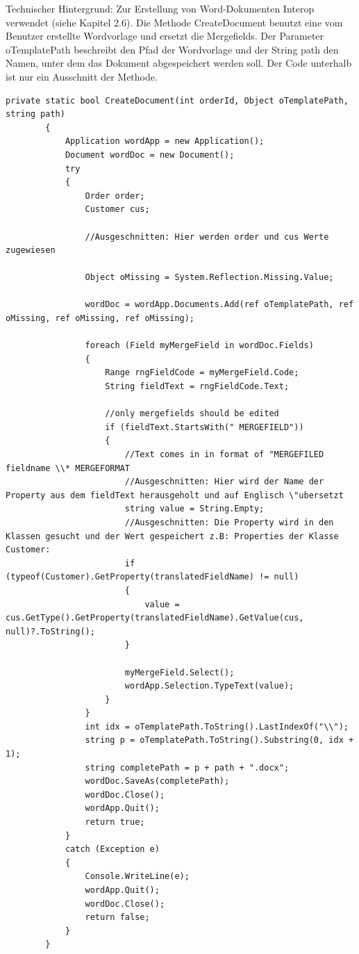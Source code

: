 Technischer Hintergrund:
Zur Erstellung von Word-Dokumenten Interop verwendet (siehe Kapitel 2.6). Die Methode CreateDocument benutzt eine vom Benutzer erstellte Wordvorlage und ersetzt die Mergefields. Der Parameter oTemplatePath beschreibt den Pfad der Wordvorlage und der String path den Namen, unter dem das Dokument abgespeichert werden soll. Der Code unterhalb ist nur ein Ausschnitt der Methode.
\begin{lstlisting}
private static bool CreateDocument(int orderId, Object oTemplatePath, string path)
        {
            Application wordApp = new Application();
            Document wordDoc = new Document();
            try
            {
                Order order;
                Customer cus;

                //Ausgeschnitten: Hier werden order und cus Werte zugewiesen 

                Object oMissing = System.Reflection.Missing.Value;

                wordDoc = wordApp.Documents.Add(ref oTemplatePath, ref oMissing, ref oMissing, ref oMissing);

                foreach (Field myMergeField in wordDoc.Fields)
                {
                    Range rngFieldCode = myMergeField.Code;
                    String fieldText = rngFieldCode.Text;

                    //only mergefields should be edited
                    if (fieldText.StartsWith(" MERGEFIELD"))
                    {
                        //Text comes in in format of "MERGEFILED fieldname \\* MERGEFORMAT
                        //Ausgeschnitten: Hier wird der Name der Property aus dem fieldText herausgeholt und auf Englisch \"ubersetzt
                        string value = String.Empty;
                        //Ausgeschnitten: Die Property wird in den Klassen gesucht und der Wert gespeichert z.B: Properties der Klasse Customer:
                        if (typeof(Customer).GetProperty(translatedFieldName) != null)
                        {
                            value = cus.GetType().GetProperty(translatedFieldName).GetValue(cus, null)?.ToString();
                        }

                        myMergeField.Select();
                        wordApp.Selection.TypeText(value);
                    }
                }
                int idx = oTemplatePath.ToString().LastIndexOf("\\");
                string p = oTemplatePath.ToString().Substring(0, idx + 1);
                string completePath = p + path + ".docx";
                wordDoc.SaveAs(completePath);
                wordDoc.Close();
                wordApp.Quit();
                return true;
            }
            catch (Exception e)
            {
                Console.WriteLine(e);
                wordApp.Quit();
                wordDoc.Close();
                return false;
            }
        }
\end{lstlisting}

